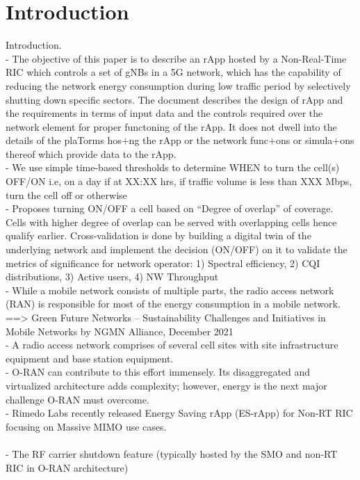 \documentclass[conference]{IEEEtran}
\begin{document}
\section{Introduction}
Introduction.
\\
- The objective of this paper is to describe an rApp hosted by a Non-Real-Time RIC which controls a set of gNBs in a 5G network, which has the capability of reducing the network energy consumption during low traffic period by selectively shutting down specific sectors. The document describes the design of rApp and the requirements in terms of input data and the controls required over the network element for proper functoning of the rApp. It does not dwell into the details of the plaTorms hos+ng the rApp or the network func+ons or simula+ons thereof which provide data to the rApp. \\
- We use simple time-based thresholds to determine WHEN to turn the cell(s) OFF/ON i.e, on a day if at XX:XX hrs, if traffic volume is less than XXX Mbps, turn the cell off or otherwise \\
- Proposes turning ON/OFF a cell based on “Degree of overlap” of coverage. Cells with higher degree of overlap can be served with overlapping cells hence qualify earlier. Cross-validation is done by building a digital twin of the underlying network and implement the decision (ON/OFF) on it to validate the metrics of significance for network operator: 1) Spectral efficiency, 2) CQI distributions, 3) Active users, 4) NW Throughput \\
- While a mobile network consists of multiple parts, the radio access network (RAN) is responsible for most of the energy consumption in a mobile network. ==> 
Green Future Networks – Sustainability Challenges and Initiatives in Mobile Networks by NGMN Alliance,
December 2021
\href{https://www.ngmn.org/wp-content/uploads/210719_NGMN_GFN_Sustainability-Challenges-andInitiatives_v1.0.pdf} \\
- A radio access network comprises of several cell sites with site infrastructure equipment and base station equipment. \\
- O-RAN can contribute to this effort immensely. Its disaggregated and virtualized architecture adds complexity; however, energy is the next major challenge O-RAN must overcome. \\
- Rimedo Labs recently released Energy Saving rApp (ES-rApp) for Non-RT RIC focusing on Massive MIMO use cases. \\ 
\\
- The RF carrier shutdown feature (typically hosted by the SMO and non-RT RIC in O-RAN architecture)
\end{document}

